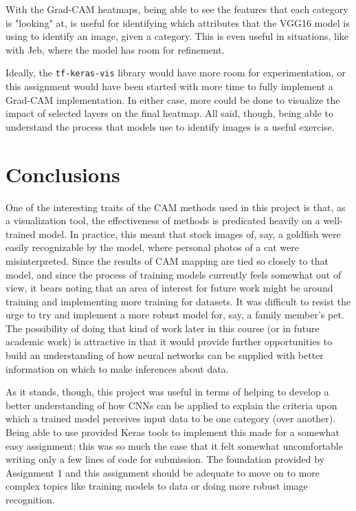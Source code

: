 \documentclass{article}
\begin{document}
\par With the Grad-CAM heatmaps, being able to see the features that each category is "looking" at, is useful for identifying which attributes that the VGG16 model is using to identify an image, given a category.
This is even useful in situations, like with Jeb, where the model has room for refinement.

\par Ideally, the \lstinline{tf-keras-vis} library would have more room for experimentation, or this assignment would have been started with more time to fully implement a Grad-CAM implementation.
In either case, more could be done to visualize the impact of selected layers on the final heatmap.
All said, though, being able to understand the process that models use to identify images is a useful exercise.

\section{Conclusions}
One of the interesting traits of the CAM methods used in this project is that, as a visualization tool, the effectiveness of methods is predicated heavily on a well-trained model.
In practice, this meant that stock images of, say, a goldfish were easily recognizable by the model, where personal photos of a cat were misinterpreted.
Since the results of CAM mapping are tied so closely to that model, and since the process of training models currently feels somewhat out of view, it bears noting that an area of interest for future work might be around training and implementing more training for datasets. It was difficult to resist the urge to try and implement a more robust model for, say, a family member's pet. 
The possibility of doing that kind of work later in this course (or in future academic work) is attractive in that it would provide further opportunities to build an understanding of how neural networks can be supplied with better information on which to make inferences about data.

\par As it stands, though, this project was useful in terms of helping to develop a better understanding of how CNNs can be applied to explain the criteria upon which a trained model perceives input data to be one category (over another).
Being able to use provided Keras tools to implement this made for a somewhat easy assignment; this was so much the case that it felt somewhat uncomfortable writing only a few lines of code for submission.
The foundation provided by Assignment 1 and this assignment should be adequate to move on to more complex topics like training models to data or doing more robust image recognition.
\end{document}
